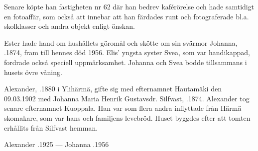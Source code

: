 Senare köpte han fastigheten nr 62 där han bedrev kaférörelse och hade samtidigt en fotoaffär, som också att innebar att han färdades runt och fotograferade bl.a. skolklasser och andra objekt enligt önskan.

Ester hade hand om hushållets göromål och skötte om sin svärmor Johanna, .1874, fram till hennes död 1956. Elis' yngsta syster Svea, som var handikappad, fordrade också speciell uppmärksamhet. Johanna och Svea bodde tillsammans i husets övre våning.
\begin{jhchildren}
  \item {}
  \item {}
\end{jhchildren}


%
Alexander, .1880 i Ylihärmä, gifte sig med efternamnet Hautamäki den 09.03.1902 med Johanna Maria Henrik Gustavsdr. Silfvast, .1874. Alexander tog senare efternamnet Kuoppala. Han var som flera andra inflyttade från Härmä skomakare, som var hans och familjens levebröd. Huset byggdes efter att tomten erhållits från Silfvast hemman.
\begin{jhchildren}
  \item {}
  \item {}
  \item {}
  \item {}
  \item {}
  \item {}
  \item {}
  \item {}
\end{jhchildren}

Alexander .1925  ---  Johanna .1956



